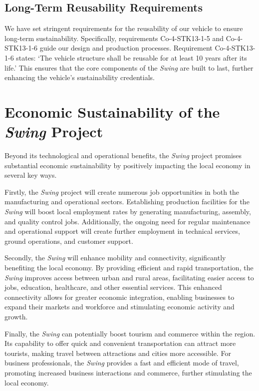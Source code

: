 \subsection*{Long-Term Reusability Requirements}
We have set stringent requirements for the reusability of our vehicle to ensure long-term sustainability.
Specifically, requirements Co-4-STK13-1-5 and Co-4-STK13-1-6 guide our design and production processes.
Requirement Co-4-STK13-1-6 states: \enquote*{The vehicle structure shall be reusable for at least 10 years after its life.}
This ensures that the core components of the \textit{Swing} are built to last, further enhancing the vehicle’s sustainability credentials.

\section{Economic Sustainability of the \textit{Swing} Project}
Beyond its technological and operational benefits, the \textit{Swing} project promises substantial economic sustainability by positively impacting the local economy in several key ways.

Firstly, the \textit{Swing} project will create numerous job opportunities in both the manufacturing and operational sectors. Establishing production facilities for the \textit{Swing} will boost local employment rates by generating manufacturing, assembly, and quality control jobs. Additionally, the ongoing need for regular maintenance and operational support will create further employment in technical services, ground operations, and customer support.

Secondly, the \textit{Swing} will enhance mobility and connectivity, significantly benefiting the local economy. By providing efficient and rapid transportation, the \textit{Swing} improves access between urban and rural areas, facilitating easier access to jobs, education, healthcare, and other essential services. This enhanced connectivity allows for greater economic integration, enabling businesses to expand their markets and workforce and stimulating economic activity and growth.

Finally, the \textit{Swing} can potentially boost tourism and commerce within the region. Its capability to offer quick and convenient transportation can attract more tourists, making travel between attractions and cities more accessible. For business professionals, the \textit{Swing} provides a fast and efficient mode of travel, promoting increased business interactions and commerce, further stimulating the local economy.






